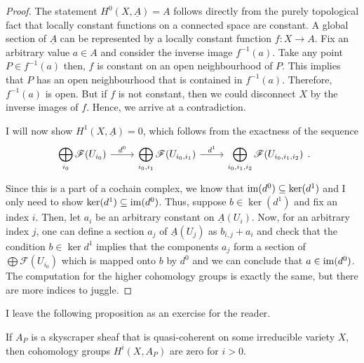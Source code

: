 \begin{proof}
  The statement $H^{0}(X,\underline{A})=A$ follows directly from the purely
  topological fact that locally constant functions on a connected space
  are constant. A global section of $\underline{A}$ can be represented
  by a locally constant function $f:X\to A$. Fix an arbitrary value $a\in A$
  and consider the inverse image $f^{-1}(a)$. Take any point $P\in f^{-1}(a)$
  then, $f$ is constant on an open neighbourhood of $P$. This implies that
  $P$ has an open neighbourhood that is contained in $f^{-1}(a)$. Therefore,
  $f^{-1}(a)$ is open. But if $f$ is not constant, then we could disconnect
  $X$ by the inverse images of $f$. Hence, we arrive at a contradiction.

  I will now show $H^{1}(X,\underline{A})=0$, which follows from the
  exactness of the sequence
  \[\begin{tikzcd}
      \displaystyle\bigoplus_{i_{0}}\mathscr{F}(U_{i_{0}})\rar{d^{0}}
      & \displaystyle\bigoplus_{i_{0},i_{1}}\mathscr{F}(U_{i_{0},i_{1}})
      \rar{d^{1}}
      & \displaystyle\bigoplus_{i_{0},i_{1},i_{2}}
      \mathscr{F}(U_{i_{0},i_{1},i_{2}})
    \end{tikzcd}.\]
  Since this is a part of a cochain complex, we know that $\operatorname{im}(d^{0})
  \subseteq\ker(d^{1})$ and I only need to show $\ker(d^{1})\subseteq
  \operatorname{im}(d^{0})$. Thus, suppose $b\in\ker(d^{1})$ and fix an index $i$. Then,
  let $a_{i}$ be an arbitrary constant on $\underline{A}(U_{i})$. Now, for
  an arbitrary index $j$, one can define a section $a_{j}$ of
  $\underline{A}(U_{j})$ as $b_{i, j}+a_{i}$ and check that the condition
  $b\in\ker d^{1}$ implies that the components $a_{j}$ form a section of
  $\displaystyle\bigoplus\mathscr{F}(U_{i_{0}})$ which is mapped onto $b$
  by $d^{0}$ and we can conclude that $a\in\operatorname{im}(d^{0})$. The computation for
  the higher cohomology groups is exactly the same, but there are more
  indices to juggle.
\end{proof}
I leave the following proposition as an exercise for the reader.
\begin{prop}\label{prop:sky_cohom}
  If $A_{P}$ is a skyscraper sheaf that is quasi-coherent on some
  irreducible variety $X$, then cohomology groups $H^{i}(X,A_{P})$ are zero
  for $i>0$.
\end{prop}
